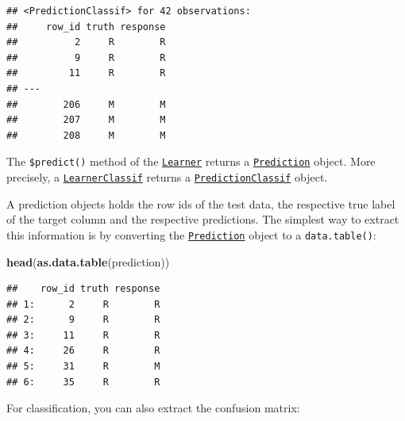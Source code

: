 \documentclass[]{scrbook}
\newenvironment{Shaded}{\begin{snugshade}}{\end{snugshade}}
\newcommand{\DataTypeTok}[1]{\textcolor[rgb]{0.13,0.29,0.53}{#1}}
\newcommand{\KeywordTok}[1]{\textcolor[rgb]{0.13,0.29,0.53}{\textbf{#1}}}
\newcommand{\NormalTok}[1]{#1}
\newcommand{\OperatorTok}[1]{\textcolor[rgb]{0.81,0.36,0.00}{\textbf{#1}}}
\newcommand{\StringTok}[1]{\textcolor[rgb]{0.31,0.60,0.02}{#1}}
\renewenvironment{Shaded} {\begin{snugshade}\small} {\end{snugshade}}
\begin{document}
\begin{Shaded}
\end{Shaded}

\begin{verbatim}
## <PredictionClassif> for 42 observations:
##     row_id truth response
##          2     R        R
##          9     R        R
##         11     R        R
## ---                      
##        206     M        M
##        207     M        M
##        208     M        M
\end{verbatim}

The \texttt{\$predict()} method of the \href{https://mlr3.mlr-org.com/reference/Learner.html}{\texttt{Learner}} returns a \href{https://mlr3.mlr-org.com/reference/Prediction.html}{\texttt{Prediction}} object.
More precisely, a \href{https://mlr3.mlr-org.com/reference/LearnerClassif.html}{\texttt{LearnerClassif}} returns a \href{https://mlr3.mlr-org.com/reference/PredictionClassif.html}{\texttt{PredictionClassif}} object.

A prediction objects holds the row ids of the test data, the respective true label of the target column and the respective predictions.
The simplest way to extract this information is by converting the \href{https://mlr3.mlr-org.com/reference/Prediction.html}{\texttt{Prediction}} object to a \texttt{data.table()}:

\begin{Shaded}
\begin{Highlighting}[]
\KeywordTok{head}\NormalTok{(}\KeywordTok{as.data.table}\NormalTok{(prediction))}
\end{Highlighting}
\end{Shaded}

\begin{verbatim}
##    row_id truth response
## 1:      2     R        R
## 2:      9     R        R
## 3:     11     R        R
## 4:     26     R        R
## 5:     31     R        M
## 6:     35     R        R
\end{verbatim}

For classification, you can also extract the confusion matrix:

\begin{Shaded}
\end{Shaded}
\end{document}
